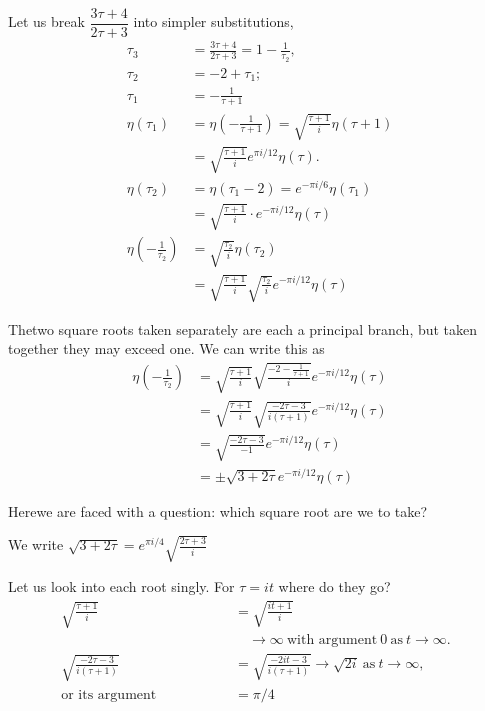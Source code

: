 Let us break $\dfrac{3 \tau +4}{2 \tau +3}$ into simpler
substitutions, 
\begin{align*}
  \tau_3 & = \frac{3 \tau+4}{2 \tau+3} =1 - \frac{1}{\tau_2},\\
  \tau_2 & = -2 + \tau_1;\\
  \tau_1 & = - \frac{1}{\tau +1}\\
  \eta(\tau_1) & = \eta \left( - \frac{1}{\tau+1}\right) =
  \sqrt{\frac{\tau +1}{i}} \eta (\tau+1)\\
  & = \sqrt{\frac{\tau+1}{i}} e^{\pi i /12} \eta (\tau).\\
  \eta (\tau_2) & = \eta (\tau_1 -2) = e^{- \pi i /6} \eta(\tau_1)\\
  & = \sqrt{\frac{\tau+1}{i}} \cdot e^{- \pi i /12} \eta(\tau)\\
  \eta \left(- \frac{1}{\tau_2} \right) & = \sqrt{\frac{\tau_2}{i}}
  \eta (\tau_2)\\
  & = \sqrt{\frac{\tau+1}{i}} \sqrt{\frac{\tau_2}{i}} e^{- \pi i /12}
  \eta (\tau)
\end{align*}

The\pageoriginale two square roots taken separately are each a principal branch, but
taken together they may exceed one. We can write this as
\begin{align*}
  \eta\left(- \frac{1}{\tau_2} \right) & = \sqrt{\frac{\tau+1}{i}}
  \sqrt{\frac{-2 - \frac{1}{\tau+1}}{i}} e^{- \pi i /12} \eta (\tau)\\
    & = \sqrt{\frac{\tau+1}{i}} \sqrt{\frac{- 2 \tau -3}{i (\tau +1)}}
    e^{- \pi i /12} \eta(\tau)\\
    & = \sqrt{\frac{- 2 \tau-3}{-1}} e^{- \pi i /12} \eta (\tau)\\
    & = \pm \sqrt{3+ 2 \tau} e^{- \pi i /12} \eta (\tau)
\end{align*}

Here\pageoriginale we are faced with a question: which square root
are we to take? 

We write $\sqrt{3+ 2 \tau}= e^{\pi i /4} \sqrt{\frac{2 \tau +3}{i}}$

Let us look into each root singly. For $\tau = it$ where do they go?
\begin{align*}
  \sqrt{\frac{\tau+1}{i}} & = \sqrt{\frac{i t+1}{i}}\\
  & \quad  \to \infty ~\text{with argument}~ 0 ~\text{as}~ t \to \infty.\\
  \sqrt{\frac{- 2 \tau -3}{i (\tau +1)}} & = \sqrt{\frac{-2 i t -3}{i
      (\tau +1)}} \to \sqrt{2 i} ~\text{as}~ t \to \infty,\hspace{1cm}\\
  \text{or its argument} \hspace{2cm}& = \pi/4
\end{align*}

